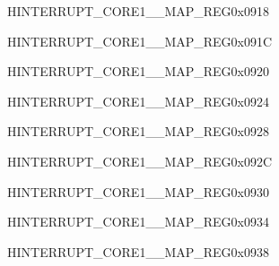 \begin{register}{H}{INTERRUPT\_CORE1\_\_MAP\_REG}{0x0918}\label{regdesc:INTERRUPTCORE1DMACH4INTMAPREG}
\end{register}
\vspace{-3em}

\begin{register}{H}{INTERRUPT\_CORE1\_\_MAP\_REG}{0x091C}\label{regdesc:INTERRUPTCORE1RSAINTMAPREG}
\end{register}
\vspace{-3em}

\begin{register}{H}{INTERRUPT\_CORE1\_\_MAP\_REG}{0x0920}\label{regdesc:INTERRUPTCORE1AESINTMAPREG}
\end{register}
\vspace{-3em}

\begin{register}{H}{INTERRUPT\_CORE1\_\_MAP\_REG}{0x0924}\label{regdesc:INTERRUPTCORE1SHAINTMAPREG}
\end{register}
\vspace{-3em}

\begin{register}{H}{INTERRUPT\_CORE1\_\_MAP\_REG}{0x0928}\label{regdesc:INTERRUPTCORE1CPUINTRFROMCPU0MAPREG}
\end{register}
\vspace{-3em}


\begin{register}{H}{INTERRUPT\_CORE1\_\_MAP\_REG}{0x092C}\label{regdesc:INTERRUPTCORE1CPUINTRFROMCPU1MAPREG}
\end{register}
\vspace{-3em}


\begin{register}{H}{INTERRUPT\_CORE1\_\_MAP\_REG}{0x0930}\label{regdesc:INTERRUPTCORE1CPUINTRFROMCPU2MAPREG}
\end{register}
\vspace{-3em}

\begin{register}{H}{INTERRUPT\_CORE1\_\_MAP\_REG}{0x0934}\label{regdesc:INTERRUPTCORE1CPUINTRFROMCPU3MAPREG}
\end{register}
\vspace{-3em}

\begin{register}{H}{INTERRUPT\_CORE1\_\_MAP\_REG}{0x0938}\label{regdesc:INTERRUPTCORE1ASSISTDEBUGINTRMAPREG}
\end{register}
\vspace{-3em}

